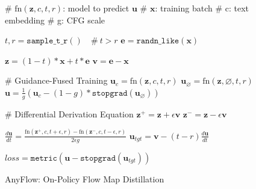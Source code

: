 \documentclass{llmxive}
\providecommand{\mycomment}[1]{\# #1}
\providecommand{\func}[1]{\texttt{#1}}
\begin{document}
\begin{figure}[!tb]
    \begin{minipage}{0.49\textwidth}
        \begin{algorithm}[H]
            \caption{AnyFlow: Forward Flow Map Training}
            \label{alg:flowmap}
            \SetInd{0.3em}{0.8em}
            \DontPrintSemicolon

            \mycomment{$\text{fn}(\mathbf{z}, c, t, r)$: model to predict $\mathbf{u}$} \;
            \mycomment{$\mathbf{x}$: training batch} \;
            \mycomment{c: text embedding} \;
            \mycomment{g: CFG scale} \;
            \vspace{1em}

            $t, r = \func{sample\_t\_r}() \quad\mycomment{\ t>r}$\;
            $\mathbf{e} = \func{randn\_like}(\mathbf{x})$\;
            \vspace{1em}
            
            $\mathbf{z} = (1 - t)*\mathbf{x} + t*\mathbf{e}$\;
            $\mathbf{v} = \mathbf{e} - \mathbf{x}$\;
            \vspace{1em}

            \mycomment{Guidance-Fused Training}\;
            $\mathbf{u}_c = \text{fn}(\mathbf{z}, c, t, r)$\;
            $\mathbf{u}_{\varnothing} = \text{fn}(\mathbf{z}, \varnothing, t, r)$\;
            $\mathbf{u} = \frac{1}{g}\left(\mathbf{u}_c - (1-g)*\func{stopgrad}(\mathbf{u}_{\varnothing})\right)$
            \vspace{1em}

            \mycomment{Differential Derivation Equation}\;
            $\mathbf{z}^{+} = \mathbf{z} + \epsilon\mathbf{v}$\;
            $\mathbf{z}^{-} = \mathbf{z} - \epsilon\mathbf{v}$\;

            $\frac{d\mathbf{u}}{dt} = \frac{\text{fn}(\mathbf{z}^+, c, t+\epsilon, r)-\text{fn}(\mathbf{z}^-, c, t-\epsilon, r)}{2\epsilon g}$\;
            $\mathbf{u}_{tgt} = \mathbf{v} - (t - r)\frac{d\mathbf{u}}{dt}$\;
            \vspace{1em}
            
            $loss = \func{metric}(\mathbf{u} - \func{stopgrad}(\mathbf{u}_{tgt}))$\;
        \end{algorithm}
    \end{minipage}
    \hfill
    \begin{minipage}{0.49\textwidth}
        \begin{algorithm}[H]
            \caption{AnyFlow: On-Policy Flow Map Distillation}
            \label{alg:onpolicy}
            \SetInd{0.3em}{0.8em}
            \DontPrintSemicolon


\end{algorithm}
\end{minipage}
\end{figure}
\end{document}
